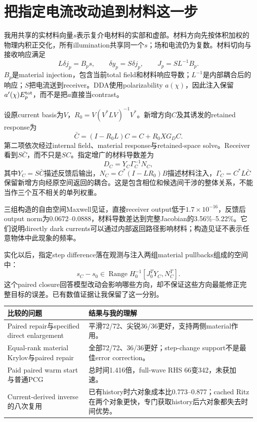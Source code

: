 \section{把指定电流改动追到材料这一步}
我用共享的实材料向量$s$表示复介电材料的实部和虚部。材料方向先按体积加权的物理内积正交化，所有illumination共享同一个$s$；场和电流仍为复数。材料切向与接收响应满足
\[
 L\delta j_p=B_ps,\qquad \delta y_p=S\delta j_p,
 \qquad J_p=SL^{-1}B_p.
\]
$B_p$是material injection，包含当前total field和材料响应导数；$L^{-1}$是内部耦合后的响应；$S$把电流送到receiver。DDA使用polarizability $a(\chi)$，因此注入保留$a'(\chi)E_p^{\rm tot}$，而不是把$a$直接当contrast。

设原current basis为$V$，$R_0=V(V^*LV)^{-1}V^*$。新增方向$C$及其诱发的retained response为
\[
 \bar C=(I-R_0L)C=C+R_0XG_DC.
\]
第二项依次经过internal field、material response与retained-space solve。Receiver看到$S\bar C$，而不只是$SC$。指定增广的材料导数差为
\[
 D_C=Y_C\Gamma_C^{-1}N_C,
\]
其中$Y_C=S\bar C$描述反馈后输出，$N_C=C^*(I-LR_0)B$描述材料注入，$\Gamma_C=C^*L\bar C$保留新增方向经原空间返回的耦合。这是包含相位和候选间干涉的整体关系，不能当作三个互不相关的单列权重。

三组构造的自由空间Maxwell见证，直接receiver output低于$1.7\times10^{-16}$，反馈后output norm为0.0672--0.0888，材料导数差达到完整Jacobian的3.56\%--5.22\%。它们说明directly dark currents可以通过内部返回路径影响材料；构造见证不表示任意物体中此现象的频率。

实化以后，指定step difference落在观测与注入两组material pullbacks组成的空间中：
\[
 s_C-s_0\in\operatorname{Range}
 H_0^{-1}[J_0^TY_C,N_C^T].
\]
这个paired closure回答模型改动会影响哪些方向，却不保证这些方向最能修正完整目标的误差。已有数值证据让我保留了这一分别。

\begin{center}\small
\begin{tabularx}{\linewidth}{@{}p{.39\linewidth}X@{}}\toprule
比较的问题&结果与我的理解\\\midrule
Paired repair与specified direct enlargement&平滑72/72、尖锐36/36更好，支持两侧material作用。\\
Equal-rank material Krylov与paired repair&全部72/72、36/36更好；step-change support不是最佳error correction。\\
Paid paired warm start与普通PCG&总时间1.416倍，full-wave RHS 66变342，未获加速。\\
Current-derived inverse的八次复用&已有history时六对象成本比0.773--0.877；cached Ritz在两个对象更快，专门获取history后六对象都失去时间优势。\\\bottomrule
\end{tabularx}
\end{center}

